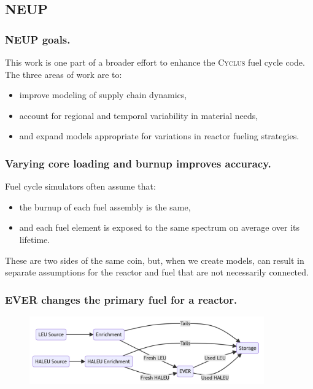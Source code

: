 \documentclass[9pt]{beamer}
\newcommand{\cyclus}{\textsc{Cyclus}\xspace}
\begin{document}
\subsection{NEUP}
\begin{frame}
  \frametitle{NEUP goals.}
  This work is one part of a broader effort to enhance the \cyclus fuel cycle code. The three areas of work are to:
  \begin{itemize}
    \item improve modeling of supply chain dynamics,
    \item account for regional and temporal variability in material needs,
    \item and expand models appropriate for variations in reactor fueling strategies.
  \end{itemize}
\end{frame}

\begin{frame}
  \frametitle{Varying core loading and burnup improves accuracy.}
  Fuel cycle simulators often \cite{out_of_core} assume that:
  \begin{itemize}
    \item the burnup of each fuel assembly is the same,
    \item and each fuel element is exposed to the same spectrum on average over its lifetime.
  \end{itemize}
  These are two sides of the same coin, but, when we create models, can result in separate assumptions for the reactor and fuel that are not necessarily connected.
\end{frame}

\begin{frame}
  \frametitle{EVER changes the primary fuel for a reactor.}
  \begin{figure}
    \centering
    \includegraphics[width=0.90\textwidth]{images/ever_diagram.png}
  \end{figure}
\end{frame}

\end{document}
